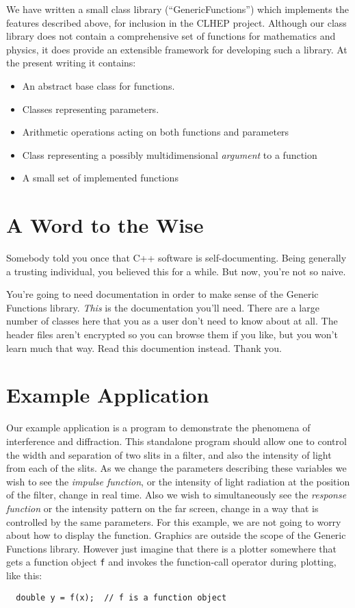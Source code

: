 \documentclass{report}
\begin{document}
\noindent We have written a small class library (``GenericFunctions'') which implements
 the features described above, for inclusion in the CLHEP project.  
Although our class library does not contain a comprehensive set of functions
for mathematics and physics, it does provide an extensible framework for 
developing such a library.  At the present writing it contains:
\begin{itemize}
\item{An abstract base class for functions.}
\item{Classes representing parameters.}
\item{Arithmetic operations acting on both functions and parameters}
\item{Class representing a possibly multidimensional {\it argument} to 
      a function}	
\item{A small set of implemented functions}
\end{itemize}

\section{A Word to the Wise}
\noindent Somebody told you once that C++ software is self-documenting.  Being generally
a trusting individual, you believed this for a while.  But now, you're not so 
naive.

\noindent You're going to need documentation in order to make sense of the
Generic Functions library.  {\it This} is the documentation you'll need.  
There are a large number of classes here that you as a user don't need to
know about at all.  The header files aren't encrypted so you can browse
them if you like, but you won't learn much that way.  Read this documention
instead.  Thank you.

\section{Example Application} 
\noindent Our example application is a program to demonstrate the phenomena of 
interference and diffraction.  This standalone program should allow one
to control the width and separation of two slits in a filter, and also
the intensity of light from each of the slits.  As we change the parameters
describing these variables we wish to see the {\it impulse function}, or
the intensity of light radiation at the position of the filter, change
in real time.  Also we wish to simultaneously see the {\it response function}
or the intensity pattern on the far screen, change in a way that is controlled
by the same parameters.  For this example, we are not going to worry about
how to display the function.  Graphics are outside the scope of the Generic 
Functions library.  However just imagine that there is a plotter somewhere
that gets a function object \verb#f# and invokes the function-call operator
during plotting, like this:
\begin{verbatim}
  double y = f(x);  // f is a function object
\end{verbatim}
\end{document}
